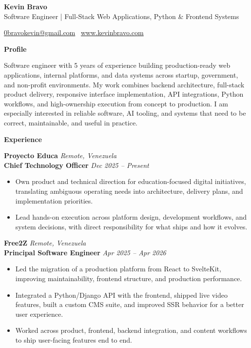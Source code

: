 \documentclass[11pt]{article}
\begin{document}
\begin{center}
    {\LARGE \textbf{Kevin Bravo}}\\
    Software Engineer | Full-Stack Web Applications, Python \& Frontend Systems \\
    \hrulefill
\end{center}
\begin{center}
    \href{mailto:0bravokevin@gmail.com}{0bravokevin@gmail.com}
    \textbullet\ 
    \href{http://www.kevinbravo.com}{www.kevinbravo.com}
\end{center}
\vspace{4pt}
\begin{center}
    \textbf{Profile}
\end{center}
\vspace{-4pt}
Software engineer with 5 years of experience building production-ready web applications, internal platforms, and data systems across startup, government, and non-profit environments. My work combines backend architecture, full-stack product delivery, responsive interface implementation, API integrations, Python workflows, and high-ownership execution from concept to production. I am especially interested in reliable software, AI tooling, and systems that need to be correct, maintainable, and useful in practice.
\vspace{8pt}
\begin{center}
    \textbf{Experience}
\end{center}
\vspace{-4pt}
\textbf{Proyecto Educa} \hfill \textit{Remote, Venezuela} \\
\textbf{Chief Technology Officer} \hfill \textit{Dec 2025 -- Present}
\begin{itemize}
    \item Own product and technical direction for education-focused digital initiatives, translating ambiguous operating needs into architecture, delivery plans, and implementation priorities.
    \item Lead hands-on execution across platform design, development workflows, and system decisions, with direct responsibility for what ships and how it evolves.
\end{itemize}
\vspace{10pt}
\textbf{Free2Z} \hfill \textit{Remote, Venezuela} \\
\textbf{Principal Software Engineer} \hfill \textit{Apr 2025 -- Apr 2026}
\begin{itemize}
    \item Led the migration of a production platform from React to SvelteKit, improving maintainability, frontend structure, and production performance.
    \item Integrated a Python/Django API with the frontend, shipped live video features, built a custom CMS suite, and improved SSR behavior for a better user experience.
    \item Worked across product, frontend, backend integration, and content workflows to ship user-facing features end to end.
\end{itemize}
\end{document}
